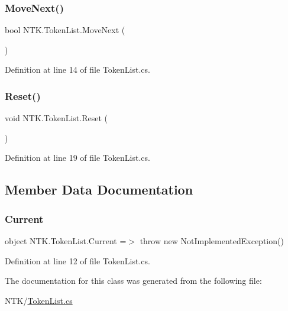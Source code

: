 \subsubsection{\texorpdfstring{MoveNext()}{MoveNext()}}
{\footnotesize\ttfamily bool N\+T\+K.\+Token\+List.\+Move\+Next (\begin{DoxyParamCaption}{ }\end{DoxyParamCaption})}



Definition at line 14 of file Token\+List.\+cs.

\mbox{\label{class_n_t_k_1_1_token_list_a7e3b0bdac1893b2150aadf922adee889}} 
\subsubsection{\texorpdfstring{Reset()}{Reset()}}
{\footnotesize\ttfamily void N\+T\+K.\+Token\+List.\+Reset (\begin{DoxyParamCaption}{ }\end{DoxyParamCaption})}



Definition at line 19 of file Token\+List.\+cs.



\subsection{Member Data Documentation}
\mbox{\label{class_n_t_k_1_1_token_list_a90d2a8e7bd79c08bb1aa98617175b86d}} 
\subsubsection{\texorpdfstring{Current}{Current}}
{\footnotesize\ttfamily object N\+T\+K.\+Token\+List.\+Current =$>$ throw new Not\+Implemented\+Exception()}



Definition at line 12 of file Token\+List.\+cs.



The documentation for this class was generated from the following file\+:\begin{DoxyCompactItemize}
\item 
N\+T\+K/\mbox{\hyperlink{_token_list_8cs}{Token\+List.\+cs}}\end{DoxyCompactItemize}

